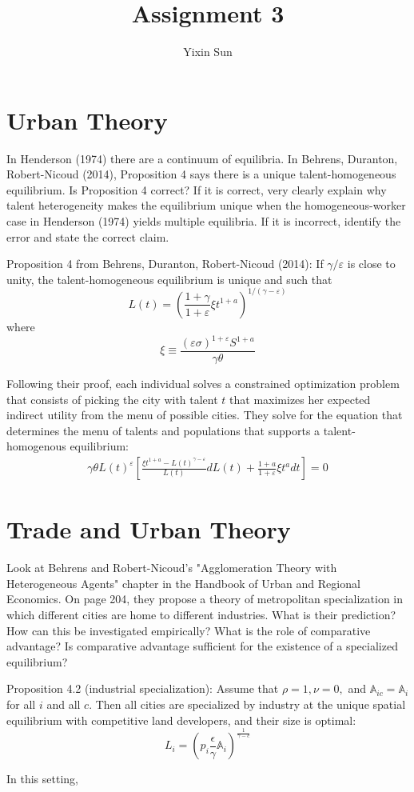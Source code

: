 \documentclass{article}
\title{Assignment 3}
\author{Yixin Sun}
\begin{document}
\maketitle

\section*{Urban Theory}

In Henderson (1974) there are a continuum of equilibria. In Behrens, Duranton, Robert-Nicoud (2014), Proposition 4 says there is a unique talent-homogeneous equilibrium. Is Proposition 4 correct? If it is correct, very clearly explain why talent heterogeneity makes the equilibrium unique when the homogeneous-worker case in Henderson (1974) yields multiple equilibria. If it is incorrect, identify the error and state the correct claim.

Proposition 4 from Behrens, Duranton, Robert-Nicoud (2014): If $\gamma / \varepsilon$ is close to unity, the talent-homogeneous equilibrium is unique and such that 
$$
L(t)=\left(\frac{1+\gamma}{1+\varepsilon} \xi t^{1+a}\right)^{1 /(\gamma-\varepsilon)}
$$
where
$$
\xi \equiv \frac{(\varepsilon \sigma)^{1+\varepsilon} S^{1+a}}{\gamma \theta}
$$

Following their proof, each individual solves a constrained optimization problem that consists of picking the city with talent $t$ that maximizes her expected indirect utility from the menu of possible cities. They solve for the equation that determines the menu of talents and populations that supports a talent-homogenous equilibrium:
\begin{align}
    \gamma \theta L(t)^{\varepsilon}\left[\frac{\xi t^{1+a}-L(t)^{\gamma-\varepsilon}}{L(t)} d L(t)+\frac{1+a}{1+\varepsilon} \xi t^{a} d t\right]=0
\end{align}


\section*{Trade and Urban Theory}
Look at Behrens and Robert-Nicoud's "Agglomeration Theory with Heterogeneous Agents" chapter in the Handbook of Urban and Regional Economics. On page 204, they propose a theory of metropolitan specialization in which different cities are home to different industries. What is their prediction? How can this be investigated empirically? What is the role of comparative advantage? Is comparative advantage sufficient for the existence of a specialized equilibrium?

Proposition 4.2 (industrial specialization):  Assume that $\rho=1, \nu=0,$ and $\mathbb{A}_{i c}=\mathbb{A}_{i}$ for all $i$ and all $c .$ Then all cities are specialized by industry at the unique spatial equilibrium with competitive land developers, and their size is optimal:
$$
L_{i}=\left(p_{i} \frac{\epsilon}{\gamma} \mathbb{A}_{i}\right)^{\frac{1}{\gamma-c}}
$$


In this setting, 
\end{document}
